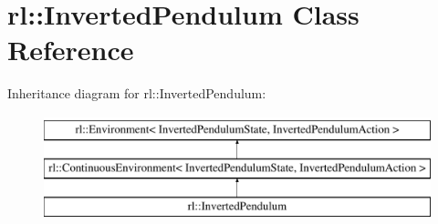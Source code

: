 \hypertarget{classrl_1_1_inverted_pendulum}{}\section{rl\+:\+:Inverted\+Pendulum Class Reference}
\label{classrl_1_1_inverted_pendulum}
Inheritance diagram for rl\+:\+:Inverted\+Pendulum\+:\begin{figure}[H]
\begin{center}
\leavevmode
\includegraphics[height=3.000000cm]{classrl_1_1_inverted_pendulum}
\end{center}
\end{figure}
